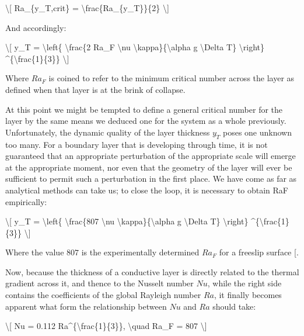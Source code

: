 \documentclass[letterpaper,10pt,english]{jupyterBook}
\begin{document}
\sphinxAtStartPar
\textbackslash{}{[} Ra\_\{y\_T,crit\} = \textbackslash{}frac\{Ra\_\{y\_T\}\}\{2\} \textbackslash{}{]}

\sphinxAtStartPar
And accordingly:

\sphinxAtStartPar
\textbackslash{}{[} y\_T = \textbackslash{}left\{ \textbackslash{}frac\{2 Ra\_F \textbackslash{}nu \textbackslash{}kappa\}\{\textbackslash{}alpha g \textbackslash{}Delta T\} \textbackslash{}right\} \textasciicircum{}\{\textbackslash{}frac\{1\}\{3\}\} \textbackslash{}{]}

\sphinxAtStartPar
Where \(Ra_F\) is coined to refer to the minimum critical  number across the layer as defined when that layer is at the brink of collapse.

\sphinxAtStartPar
At this point we might be tempted to define a general critical  number for the layer by the same means we deduced one for the system as a whole previously. Unfortunately, the dynamic quality of the layer thickness \(y_T\) poses one unknown too many. For a boundary layer that is developing through time, it is not guaranteed that an appropriate perturbation of the appropriate scale will emerge at the appropriate moment, nor even that the geometry of the layer will ever be sufficient to permit such a perturbation in the first place. We have come as far as analytical methods can take us; to close the loop, it is necessary to obtain RaF empirically:

\sphinxAtStartPar
\textbackslash{}{[} y\_T = \textbackslash{}left\{ \textbackslash{}frac\{807 \textbackslash{}nu \textbackslash{}kappa\}\{\textbackslash{}alpha g \textbackslash{}Delta T\} \textbackslash{}right\} \textasciicircum{}\{\textbackslash{}frac\{1\}\{3\}\} \textbackslash{}{]}

\sphinxAtStartPar
Where the value \(807\) is the experimentally determined \(Ra_F\) for a free\sphinxhyphen{}slip surface {[}\sphinxcite{references:id78}{]}.

\sphinxAtStartPar
Now, because the thickness of a conductive layer is directly related to the thermal gradient across it, and thence to the Nusselt number \(Nu\), while the right side contains the coefficients of the global Rayleigh number \(Ra\), it finally becomes apparent what form the relationship between \(Nu\) and \(Ra\) should take:

\sphinxAtStartPar
\textbackslash{}{[} Nu = 0.112 Ra\textasciicircum{}\{\textbackslash{}frac\{1\}\{3\}\}, \textbackslash{}quad Ra\_F = 807 \textbackslash{}{]}
\end{document}
